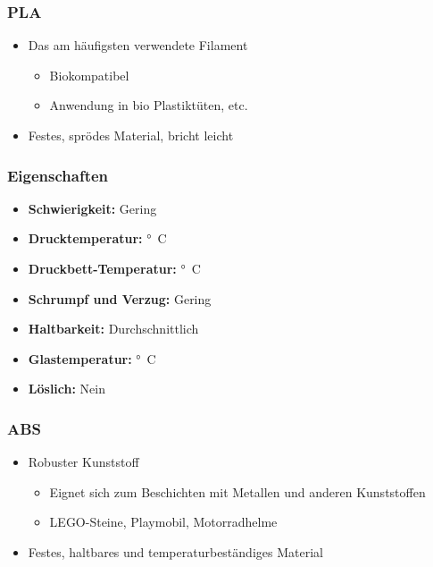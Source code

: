 {
\begin{frame}
  \frametitle{PLA}
  \pause
  \begin{itemize}
    \item Das am häufigsten verwendete Filament \pause
    \begin{itemize}
      \item Biokompatibel
      \item Anwendung in bio Plastiktüten, etc. \pause
    \end{itemize}
    \item Festes, sprödes Material, bricht leicht
  \end{itemize}
\end{frame}

\begin{frame}
  \frametitle{Eigenschaften}
  \pause
  \begin{itemize}
    \item \textbf{Schwierigkeit:} Gering
    \item \textbf{Drucktemperatur:} \unit[180 - 230]{°C}
    \item \textbf{Druckbett-Temperatur:} \unit[20 - 60]{°C}
    \item \textbf{Schrumpf und Verzug:} Gering
    \item \textbf{Haltbarkeit:} Durchschnittlich
    \item \textbf{Glastemperatur:} \unit[45-65]{°C}
    \item \textbf{Löslich:} Nein
  \end{itemize}
\end{frame}

\begin{frame}
  \frametitle{ABS}
  \pause
  \begin{itemize}
    \item Robuster Kunststoff \pause
    \begin{itemize}
      \item Eignet sich zum Beschichten mit Metallen und anderen Kunststoffen
      \item LEGO-Steine, Playmobil, Motorradhelme \pause
    \end{itemize}
    \item Festes, haltbares und temperaturbeständiges Material
  \end{itemize}
\end{frame}

}
